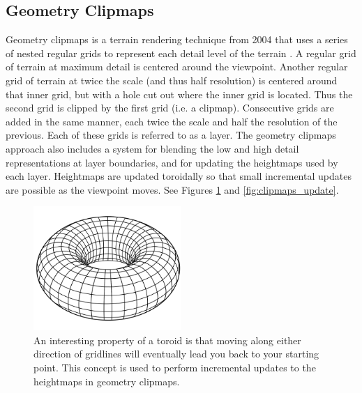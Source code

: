 \subsection{Geometry Clipmaps}

Geometry clipmaps is a terrain rendering technique from 2004 that uses a series of nested regular grids to represent each detail level of the terrain \cite{geometry_clipmaps}.
A regular grid of terrain at maximum detail is centered around the viewpoint.
Another regular grid of terrain at twice the scale (and thus half resolution) is centered around that inner grid, but with a hole cut out where the inner grid is located.
Thus the second grid is clipped by the first grid (i.e. a clipmap).
Consecutive grids are added in the same manner, each twice the scale and half the resolution of the previous.
Each of these grids is referred to as a layer.
The geometry clipmaps approach also includes a system for blending the low and high detail representations at layer boundaries, and for updating the heightmaps used by each layer.
Heightmaps are updated toroidally so that small incremental updates are possible as the viewpoint moves.
See Figures \ref{fig:toroid} and \ref{fig:clipmaps_update}.

\begin{figure}
	\centering
		\includegraphics[width=0.5\textwidth]{figures/toroid.png}
	\caption{
		An interesting property of a toroid is that moving along either direction of gridlines will eventually lead you back to your starting point.
		This concept is used to perform incremental updates to the heightmaps in geometry clipmaps.
	}
	\label{fig:toroid}
\end{figure}

